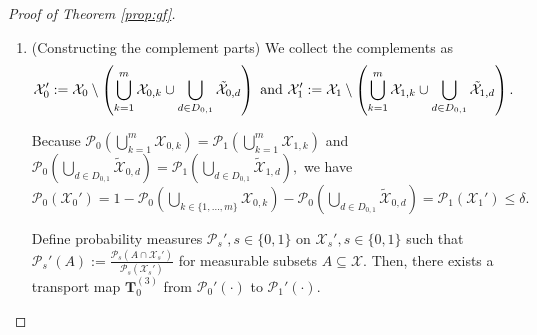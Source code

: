 \documentclass[10pt]{article} %
\begin{document}
\begin{proof}[Proof of Theorem \ref{prop:gf}]
\begin{enumerate}
        For each $d \in D_{0, 1},$
        we define probability measures $\tilde{\mathcal{P}}_{s, d}, s \in \{ 0, 1 \}$ such that
        $
        \tilde{\mathcal{P}}_{s, d}(A) := \mathcal{P}_{s}(A \cap \tilde{\mathcal{X}}_{s, d}) / \mathcal{P}_{s} (\tilde{\mathcal{X}}_{s, d})
        $
        for measurable subsets $A \subseteq \mathcal{X}.$        
        Then, there exists a transport map $\mathbf{T}_{0, d}^{(2)}$ from 
        $\tilde{\mathcal{P}}_{0, d}(\cdot)$ to $\tilde{\mathcal{P}}_{1, d}(\cdot).$
        By the definition of $\tilde{\mathcal{X}}_{0, d},$ we have that
        \begin{equation}\label{eq:prop:gf_2}
            f(\mathbf{x}, 0) = f(\mathbf{T}_{0, d}^{(2)}(\mathbf{x}), 1) = d, \forall \mathbf{x} \in \tilde{\mathcal{X}}_{0, d}.
        \end{equation}

        \item (Constructing the complement parts)
        We collect the complements as
        $$
        \mathcal{X}_{0}' := \mathcal{X}_{0} \setminus \left( \bigcup_{k=1}^{m} \mathcal{X}_{0, k} \cup \bigcup_{d \in D_{0, 1}} \tilde{\mathcal{X}}_{0, d} \right)
        \textup{ and }
        \mathcal{X}_{1}' := \mathcal{X}_{1} \setminus \left( \bigcup_{k=1}^{m} \mathcal{X}_{1, k} \cup \bigcup_{d \in D_{0, 1}} \tilde{\mathcal{X}}_{1, d} \right).
        $$

        Because $ \mathcal{P}_{0} ( \bigcup_{k=1}^{m} \mathcal{X}_{0, k} ) = \mathcal{P}_{1}( \bigcup_{k=1}^{m} \mathcal{X}_{1, k} )$
        and $\mathcal{P}_{0} ( \bigcup_{d \in D_{0, 1}} \tilde{\mathcal{X}}_{0, d} ) = \mathcal{P}_{1}( \bigcup_{d \in D_{0, 1}} \tilde{\mathcal{X}}_{1, d} ),$
        we have 
        $ \mathcal{P}_{0}( \mathcal{X}_{0}' ) 
        = 1 - \mathcal{P}_{0} ( \bigcup_{k \in \{1, \ldots, m \} } \mathcal{X}_{0, k} ) - \mathcal{P}_{0} ( \bigcup_{d \in D_{0, 1}} \tilde{\mathcal{X}}_{0, d} ) = \mathcal{P}_{1}( \mathcal{X}_{1}' ) \le \delta. $

        Define probability measures $\mathcal{P}_{s}', s \in \{ 0, 1 \}$ on $\mathcal{X}_{s}', s \in \{0, 1\}$ such that
        $ \mathcal{P}_{s}'(A) := \frac{\mathcal{P}_{s}(A \cap \mathcal{X}_{s}')}{\mathcal{P}_{s} (\mathcal{X}_{s}')} $
        for measurable subsets $A \subseteq \mathcal{X}.$
        Then, there exists a transport map $\mathbf{T}_{0}^{(3)}$ from $\mathcal{P}_{0}'(\cdot)$ to $\mathcal{P}_{1}'(\cdot).$


\end{enumerate}
\end{proof}
\end{document}
